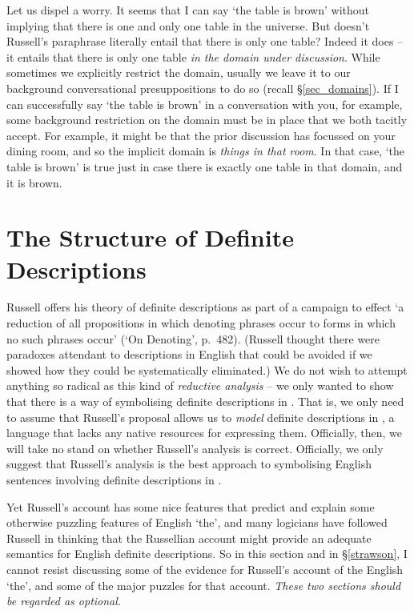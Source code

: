Let us dispel a worry. It seems that I can say `the table is brown' without implying that there is one and only one table in the universe. But doesn't Russell's paraphrase literally entail that there is only one table? Indeed it does – it entails that there is only one table \emph{in the domain under discussion}. While sometimes we explicitly restrict the domain, usually we leave it to our background conversational presuppositions to do so (recall §\ref{sec_domains}). If I can successfully say `the table is brown' in a conversation with you, for example, some background restriction on the domain must be in place that we both tacitly accept. For example, it might be that the prior discussion has focussed on your dining room, and so the implicit domain is \emph{things in that room}. In that case, `the table is brown' is true just in case there is exactly one table in that domain, and it is brown.



\section{The Structure of Definite Descriptions}

Russell offers his theory of definite descriptions as part of a campaign to effect `a reduction of all propositions in which denoting phrases occur to forms in which no such phrases occur' (`On Denoting', p.\ 482). (Russell thought there were paradoxes attendant to descriptions in English that could be avoided if we showed how they could be systematically eliminated.) We do not wish to attempt anything so radical as this kind of \emph{reductive analysis} – we only wanted to show that there is a way of symbolising definite descriptions in \FOL. That is, we only need to assume that Russell's proposal allows us to \emph{model} definite descriptions in \FOL, a language that lacks any native resources for expressing them. Officially, then, we will take no stand on whether Russell's analysis is correct. Officially, we only suggest that Russell's analysis is the best approach to symbolising English sentences involving definite descriptions in \FOL. 

Yet Russell's account has some nice features that predict and explain some otherwise puzzling features of English `the', and many logicians have followed Russell in thinking that the Russellian account might provide an adequate semantics for English definite descriptions. So in this section and in §\ref{strawson}, I cannot resist discussing some of the evidence for Russell's account of the English `the', and some of the major puzzles for that account. \emph{These two sections should be regarded as optional.}

